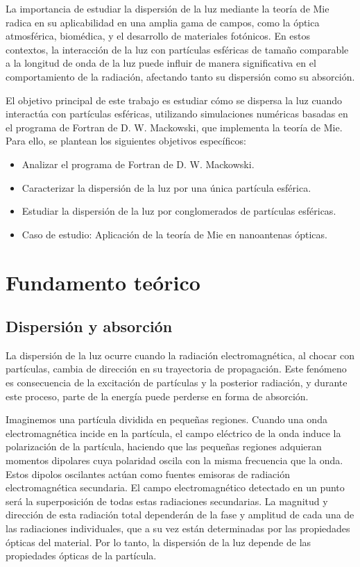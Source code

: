 \documentclass{article}
\begin{document}
La importancia de estudiar la dispersión de la luz 
mediante la teoría de Mie radica en su aplicabilidad 
en una amplia gama de campos, como la óptica atmosférica, 
biomédica, y el desarrollo de materiales fotónicos. En 
estos contextos, la interacción de la luz con partículas 
esféricas de tamaño comparable a la longitud de onda de 
la luz puede influir de manera significativa en el 
comportamiento de la radiación, afectando tanto su 
dispersión como su absorción.

El objetivo principal de este trabajo es estudiar 
cómo se dispersa la luz cuando interactúa con partículas 
esféricas, utilizando simulaciones numéricas basadas 
en el programa de Fortran de D. W. Mackowski, que implementa 
la teoría de Mie. Para ello, se plantean los siguientes 
objetivos específicos:

\begin{itemize}
\item Analizar el programa de Fortran de D. W. Mackowski.
\item Caracterizar la dispersión de la luz por una única 
        partícula esférica.
\item Estudiar la dispersión de la luz por conglomerados 
        de partículas esféricas.
\item Caso de estudio: Aplicación de la teoría de Mie en 
        nanoantenas ópticas.
\end{itemize}

\section{Fundamento teórico}
\subsection{Dispersión y absorción}
La dispersión de la luz ocurre cuando la radiación electromagnética, 
al chocar con partículas, cambia de dirección en su trayectoria de 
propagación. Este fenómeno es consecuencia de la excitación de partículas 
y la posterior radiación, y durante este proceso, parte de la energía 
puede perderse en forma de absorción.


Imaginemos una partícula dividida en pequeñas regiones. Cuando una 
onda electromagnética incide en la partícula, el campo eléctrico de 
la onda induce la polarización de la partícula, haciendo que las pequeñas 
regiones adquieran momentos dipolares cuya polaridad oscila con la misma 
frecuencia que la onda. Estos dipolos oscilantes actúan como fuentes 
emisoras de radiación electromagnética secundaria. El campo electromagnético 
detectado en un punto será la superposición de todas estas radiaciones secundarias. 
La magnitud y dirección de esta radiación total dependerán de la fase y 
amplitud de cada una de las radiaciones individuales, que a su vez están 
determinadas por las propiedades ópticas del material. Por lo tanto, la 
dispersión de la luz depende de las propiedades ópticas de la partícula.
\end{document}
